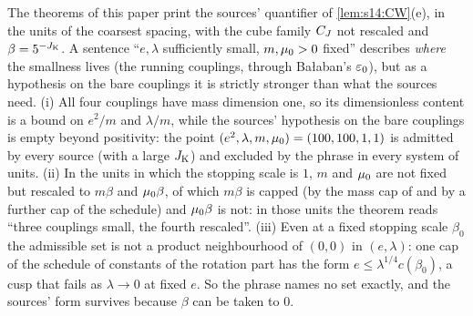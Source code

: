 \begin{remark}\label{rem:s14:quantifier}
The theorems of this paper print the sources' quantifier of \cref{lem:s14:CW}(e), in the units of the coarsest spacing, with the cube family $C_J$ not rescaled and $\beta=5^{-J_{\rm K}}$. A sentence ``$e,\lambda$ sufficiently small, $m,\mu_0>0$ fixed'' describes \emph{where} the smallness lives (the running couplings, through Ba{\l}aban's $\varepsilon_0$), but as a hypothesis on the bare couplings it is strictly stronger than what the sources need. (i) All four couplings have mass dimension one, so its dimensionless content is a bound on $e^2/m$ and $\lambda/m$, while the sources' hypothesis on the bare couplings is empty beyond positivity: the point $(e^2,\lambda,m,\mu_0)=(100,100,1,1)$ is admitted by every source (with a large $J_{\rm K}$) and excluded by the phrase in every system of units. (ii) In the units in which the stopping scale is $1$, $m$ and $\mu_0$ are not fixed but rescaled to $m\beta$ and $\mu_0\beta$, of which $m\beta$ is capped (by the mass cap of \cite[Prop.~3.1]{Ba2} and by a further cap of the schedule) and $\mu_0\beta$ is not: in those units the theorem reads ``three couplings small, the fourth rescaled''. (iii) Even at a fixed stopping scale $\beta_0$ the admissible set is not a product neighbourhood of $(0,0)$ in $(e,\lambda)$: one cap of the schedule of constants of the rotation part has the form $e\le\lambda^{1/4}c(\beta_0)$, a cusp that fails as $\lambda\to0$ at fixed $e$. So the phrase names no set exactly, and the sources' form survives because $\beta$ can be taken to $0$.
\end{remark}
